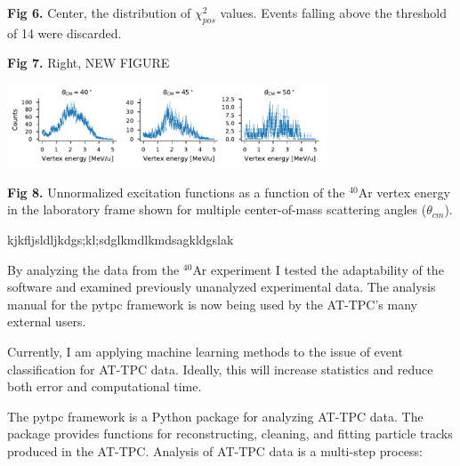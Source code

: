 \documentclass[ansiepaper,portrait]{baposter}
\begin{document}
\begin{poster}
{\small{\textbf{Fig 6.} Center, the distribution of $\chi_{pos}^{2}$ values. Events falling above the threshold of 14 were discarded.}

\small{\textbf{Fig 7.} Right, NEW FIGURE}

\begin{center}
\includegraphics [width=95mm] {angular_excitation_hists_POSTER.pdf}
\end{center}
\small{\textbf{Fig 8.} Unnormalized excitation functions as a function of the $^{40}$Ar vertex energy in the laboratory frame shown for multiple center-of-mass scattering angles ($\theta_{cm}$).}
}

{\small{kjkfljsldljkdgs;kl;sdglkmdlkmdsagkldgslak}
}
{\small{By analyzing the data from the $^{40}$Ar experiment I tested the adaptability of the software and examined previously unanalyzed experimental data. The analysis manual for the pytpc framework is now being used by the AT-TPC's many external users.

Currently, I am applying machine learning methods to the issue of event classification for AT-TPC data. Ideally, this will increase statistics and reduce both error and computational time. }
}

{\small{The pytpc framework is a Python package for analyzing AT-TPC data. The package provides functions for reconstructing, cleaning, and fitting particle tracks produced in the AT-TPC. Analysis of AT-TPC data is a multi-step process:

}}
\end{poster}
\end{document}
